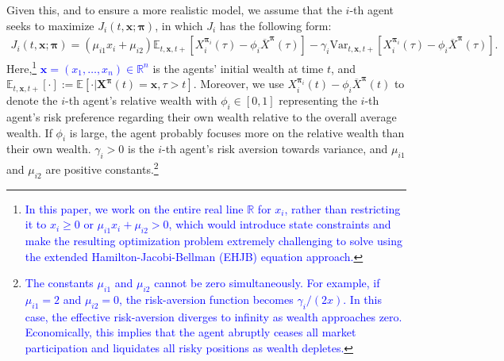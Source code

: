 \documentclass[11pt]{article}
\newcommand \gam {\gamma}
\numberwithin{equation}{section}
\newcommand{\blue}[1]{\textcolor{blue}{#1}}
\newcommand{\bpi}{\boldsymbol{\pi}}
\begin{document}
Given this, and to ensure a more realistic model, we assume that the \(i\)-th agent seeks to maximize $J_i(t,\bm{x};\boldsymbol{\pi})$, in which $J_i$ has the following form:
\begin{align}
J_i(t,\bm{x};\boldsymbol{\pi})=({\mu_{i1}x_i+\mu_{i2}})\mathbb{E}_{t,\bm{x},t +}[X^{\bpi_i}_i(\tau)-\phi_i\overline{X}^{\bpi}(\tau)]-{\gamma_i}\text{Var}_{t,\bm{x},t +}[X^{\bpi_i}_i(\tau)-\phi_i\overline{X}^{\bpi}(\tau)]. \label{eq:n-cost}
\end{align}
Here,\footnote{\blue{In this paper, we work on the entire real line \(\mathbb{R}\) for \(x_i\), rather than restricting it to \(x_i\ge 0\) or \(\mu_{i1}x_i+\mu_{i2}>0\), which would introduce state constraints and make the resulting optimization problem extremely challenging to solve using the extended Hamilton-Jacobi-Bellman (EHJB) equation approach.}} \textcolor{blue}{\(\bm{x}=(x_1,\ldots,x_n)\in\mathbb{R}^n\)} is the agents' initial wealth at time $t$, and \(\mathbb{E}_{t,\bm{x},t +}[\cdot]:=\mathbb{E}[\cdot|\bm{X}^{\bpi}(t)=\bm{x},\tau > t]\). Moreover, we use \(X^{\bpi_i}_i(t)-\phi_i\overline{X}^{\bpi}(t)\) to denote the \(i\)-th agent's relative wealth with \(\phi_i\in[0,1]\) representing the \(i\)-th agent's risk preference regarding their own wealth relative to the overall average wealth. If $\phi_i$ is large, the agent probably focuses more on the relative wealth than their own wealth. $\gam_i>0$ is the \(i\)-th agent's risk aversion towards variance, and \(\mu_{i1}\) and \(\mu_{i2}\) are positive constants.\footnote{\blue{The constants \(\mu_{i1}\) and \(\mu_{i2}\) cannot be zero simultaneously. For example, if \(\mu_{i1}=2\) and \(\mu_{i2}=0\), the risk-aversion function becomes \(\gamma_i/(2x)\). In this case, the effective risk-aversion diverges to infinity as wealth approaches zero. Economically, this implies that the agent abruptly ceases all market participation and liquidates all risky positions as wealth depletes.}}
\end{document}
